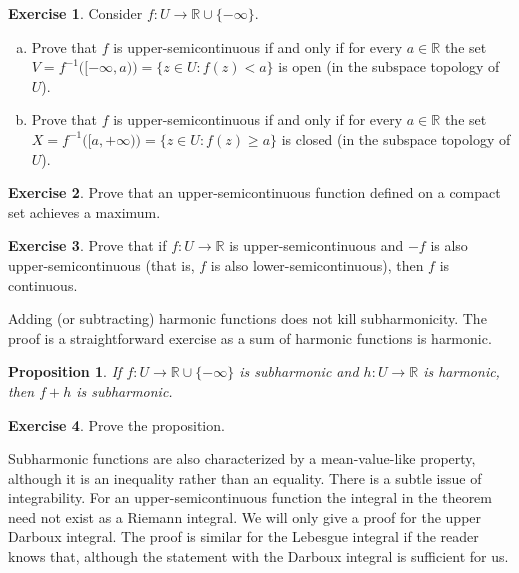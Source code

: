 \documentclass[12pt,openany]{book}
\newcommand{\R}{{\mathbb{R}}}
\theoremstyle{plain}
\newtheorem{prop}[thm]{Proposition}
\theoremstyle{remark}
\theoremstyle{definition}
\newenvironment{exbox}{%
    \def\FrameCommand{\vrule width 1pt \relax\hspace{10pt}}%
    \MakeFramed{\advance\hsize-\width\FrameRestore}%
}{%
    \endMakeFramed
}
\newenvironment{exparts}{%
    \leavevmode\begin{enumerate}[a),noitemsep,topsep=0pt,parsep=0pt,partopsep=0pt]
}{%
    \end{enumerate}
}
\theoremstyle{exercise}
\newtheorem{exercise}{Exercise}[section]
\theoremstyle{example}
\begin{document}
\begin{exbox}
\begin{exercise}%
\label{exercise:uppersemicontclosedopen}
Consider $f \colon U \to \R \cup \{-\infty\}$.
\begin{exparts}
\item
Prove that $f$ is upper-semicontinuous if and only if
for every $a \in \R$
the set
$V = f^{-1}\bigl([-\infty,a)\bigr) = \bigl\{ z \in U : f(z) < a \bigr\}$
is open (in the subspace topology of $U$).
\item
Prove that $f$ is upper-semicontinuous if and only if
for every $a \in \R$
the set
$X = f^{-1}\bigl([a,+\infty)\bigr) = \bigl\{ z \in U : f(z) \geq a \bigr\}$
is closed (in the subspace topology of $U$).
\end{exparts}
\end{exercise}

\begin{exercise}%
\label{exercise:uppersemicontmax}
Prove that an upper-semicontinuous function defined on a compact set achieves a maximum.
\end{exercise}

\begin{exercise}
Prove that if $f \colon U \to \R$ is upper-semicontinuous and $-f$ is also
upper-semicontinuous (that is, $f$ is also lower-semicontinuous), then $f$
is continuous.
\end{exercise}
\end{exbox}

Adding (or subtracting) 
harmonic functions does not kill subharmonicity.  The proof is a
straightforward exercise
as a sum of harmonic functions is harmonic.

\begin{prop} \label{prop:fplushsubharmonic}
If $f \colon U \to \R \cup \{ - \infty \}$ is subharmonic and $h \colon U
\to \R$ is harmonic, then $f+h$ is subharmonic.
\end{prop}

\begin{exbox}
\begin{exercise}
Prove the proposition.
\end{exercise}
\end{exbox}

Subharmonic functions are also characterized by a mean-value-like property,
although it is an inequality rather than an equality.  There is a subtle
issue of integrability.  For an upper-semicontinuous function
the integral in the theorem need not exist as a Riemann integral.
We will only give a proof for the upper Darboux integral.
The proof is 
similar for the Lebesgue integral if the reader knows that, although
the statement with the Darboux integral is sufficient for us.
\end{document}
